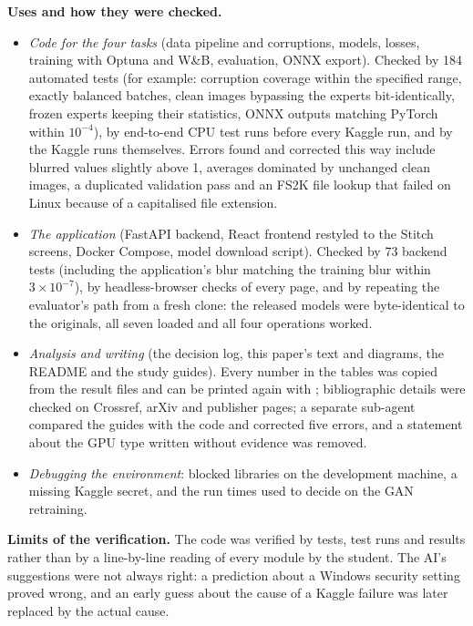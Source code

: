 \documentclass[conference]{IEEEtran}
\DeclareRobustCommand{\file}[1]{\expandafter\filepath\expandafter{\detokenize{#1}}}
\begin{document}
\textbf{Uses and how they were checked.}
\begin{itemize}
  \item \emph{Code for the four tasks} (data pipeline and corruptions,
  models, losses, training with Optuna and W\&B, evaluation, ONNX export).
  Checked by 184 automated tests (for example: corruption coverage within
  the specified range, exactly balanced batches, clean images bypassing the
  experts bit-identically, frozen experts keeping their statistics, ONNX
  outputs matching PyTorch within $10^{-4}$), by end-to-end CPU test runs
  before every Kaggle run, and by the Kaggle runs themselves. Errors found
  and corrected this way include blurred values slightly above 1, averages
  dominated by unchanged clean images, a duplicated validation pass and an
  FS2K file lookup that failed on Linux because of a capitalised file
  extension.
  \item \emph{The application} (FastAPI backend, React frontend restyled to
  the Stitch screens, Docker Compose, model download script). Checked by 73
  backend tests (including the application's blur matching the training
  blur within $3\times10^{-7}$), by headless-browser checks of every page,
  and by repeating the evaluator's path from a fresh clone: the released
  models were byte-identical to the originals, all seven loaded and all four
  operations worked.
  \item \emph{Analysis and writing} (the decision log, this paper's text and
  diagrams, the README and the study guides). Every number in the tables was
  copied from the result files and can be printed again with
  \file{scripts/show_results.py}; bibliographic details were checked on
  Crossref, arXiv and publisher pages; a separate sub-agent compared the
  guides with the code and corrected five errors, and a statement about the
  GPU type written without evidence was removed.
  \item \emph{Debugging the environment}: blocked libraries on the
  development machine, a missing Kaggle secret, and the run times used to
  decide on the GAN retraining.
\end{itemize}

\textbf{Limits of the verification.} The code was verified by tests, test
runs and results rather than by a line-by-line reading of every module by
the student. The AI's suggestions were not always right:
a prediction about a Windows security setting proved wrong, and an early
guess about the cause of a Kaggle failure was later replaced by the actual
cause.
\end{document}
